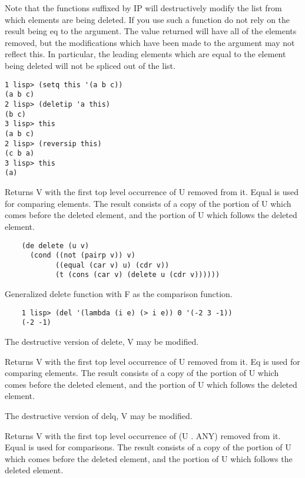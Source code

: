 Note  that  the  functions  suffixed  by IP will destructively
modify the list from which elements are being deleted.   If  you
use  such  a  function do not rely on the result being eq to the
argument.  The value returned will  have  all  of  the  elements
removed,    but  the  modifications  which have been made to the
argument may not reflect  this.    In  particular,  the  leading
elements  which  are equal to the element being deleted will not
be spliced out of the list.

\begin{verbatim}
1 lisp> (setq this '(a b c))
(a b c)
2 lisp> (deletip 'a this)
(b c)
3 lisp> this
(a b c)
2 lisp> (reversip this)
(c b a)
3 lisp> this
(a)
\end{verbatim}

{    Returns V with the first top level occurrence of  U  removed
    from  it.  Equal is used for comparing elements.  The result
    consists of a copy of the portion of U  which  comes  before
    the  deleted element, and the portion of U which follows the
    deleted element.
}
\begin{verbatim}
    (de delete (u v)
      (cond ((not (pairp v)) v)
            ((equal (car v) u) (cdr v))
            (t (cons (car v) (delete u (cdr v))))))
\end{verbatim}

{    Generalized  delete  function  with  F  as  the   comparison
    function.
}
\begin{verbatim}
    1 lisp> (del '(lambda (i e) (> i e)) 0 '(-2 3 -1))
    (-2 -1)
\end{verbatim}

{    The destructive version of delete,  V may be modified.
}

{    Returns  V  with the first top level occurrence of U removed
    from it.  Eq is used for comparing  elements.    The  result
    consists  of  a  copy of the portion of U which comes before
    the deleted element, and the portion of U which follows  the
    deleted element.
}

{    The destructive version of delq,  V may be modified.
}

{    Returns  V  with the first top level occurrence of (U . ANY)
    removed from it.  Equal is used for comparisons.  The result
    consists of a copy of the portion of U  which  comes  before
    the  deleted element, and the portion of U which follows the
    deleted element.
}

